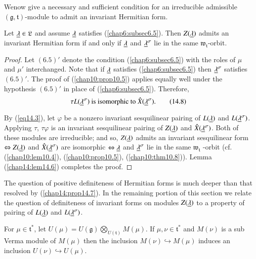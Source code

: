 We\pageoriginale now give a necessary and sufficient condition for an
irreducible admissible $(\mathfrak{g}, \mathfrak{t})$-module to admit
an invariant Hermitian form. 

\begin{prop}\label{chap14:prop14.7}
Let $\underline{\lambda} \in \mathfrak{L}$ and assume $\underline{\lambda}$ satisfies
(\ref{chap6:subsec6.5}). Then $Z(\underline{\lambda})$ admits an invariant Hermitian form if and
only if $\underline{\lambda}$ and $\underline{\lambda}^\sigma$ lie in the same
$\mathfrak{w}_\mathfrak{t}$-orbit. 
\end{prop}

\begin{proof}
Let $(6.5)'$ denote the condition (\ref{chap6:subsec6.5}) with the roles of $\mu$ and
$\mu'$ interchanged. Note that if $\underline{\lambda}$ satisfies (\ref{chap6:subsec6.5}) then
$\underline{\lambda}^\sigma$ satisfies $(6.5)'$. The proof of (\ref{chap10:prop10.5}) applies
equally well under the hypothesis $(6.5)'$ in place of
(\ref{chap6:subsec6.5}). Therefore, 
\begin{equation*}
\tau L (\underline{\lambda}^\sigma) \text{ is isomorphic to }
\hat{X}(\underline{\lambda}^\sigma).  \tag{14.8}\label{eq14.8} 
\end{equation*}

By (\ref{eq14.3}), let $\varphi$ be a nonzero invariant sesquilinear pairing
of $L(\underline{\lambda})$ and $L(\underline{\lambda}^\sigma)$. Applying $\tau$,
$\tau \varphi$ is an invariant sesquilinear pairing of
$Z(\underline{\lambda})$ and $\hat{X} (\underline{\lambda}^\sigma)$. Both of these
modules are irreducible; and so, $Z(\underline{\lambda})$ admits an invariant
sesquilinear form $\Leftrightarrow Z(\underline{\lambda})$ and
$\hat{X}(\underline{\lambda}^\sigma)$ are isomorphic
$\Leftrightarrow\underline{\lambda}$ and $\underline{\lambda}^{\sigma}$ lie in the same
$\mathfrak{w}_\mathfrak{t}$ -orbit (cf. (\ref{chap10:lem10.4}),
(\ref{chap10:prop10.5}), (\ref{chap10:thm10.8})). Lemma 
(\ref{chap14:lem14.6}) completes the proof. 
\end{proof}

The question of positive definiteness of Hermitian forms is much
deeper than that resolved by (\ref{chap14:prop14.7}). In the remaining portion of this
section we relate the question of definiteness of invariant forms on
modules $Z(\underline{\lambda})$ to a property of pairing of $L(\underline{\lambda})$
and $L(\underline{\lambda}^\sigma)$. 

For $\mu \in \mathfrak{t}^*$, let $U(\mu) =
U(\mathfrak{g})\bigotimes\limits_{U(\mathfrak{t})} M(\mu)$. If $\mu,
\nu \in \mathfrak{t}^*$ and $M(\nu)$ is a sub Verma module of $M(\mu)$
then the inclusion $M(\nu) \hookrightarrow M(\mu)$ induces an
inclusion $U(\nu) \hookrightarrow U(\mu)$. 

